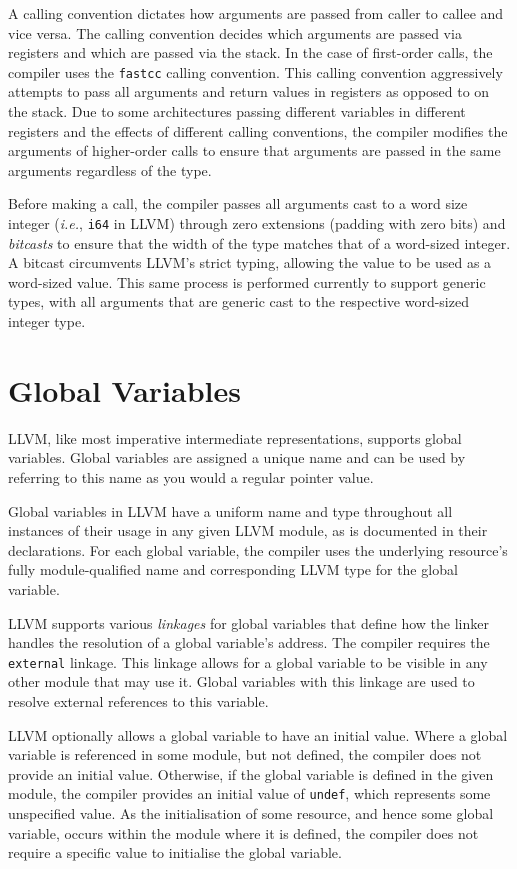 A calling convention dictates how arguments are passed from caller to callee and vice versa. The calling convention decides which arguments are passed via registers and which are passed via the stack. In the case of first-order calls, the compiler uses the \texttt{fastcc} calling convention. This calling convention aggressively attempts to pass all arguments and return values in registers as opposed to on the stack. Due to some architectures passing different variables in different registers and the effects of different calling conventions, the compiler modifies the arguments of higher-order calls to ensure that arguments are passed in the same arguments regardless of the type. 

Before making a call, the compiler passes all arguments cast to a word size integer (\textit{i.e.}, \texttt{i64} in LLVM) through zero extensions (padding with zero bits) and \textit{bitcasts} to ensure that the width of the type matches that of a word-sized integer. A bitcast circumvents LLVM's strict typing, allowing the value to be used as a word-sized value. This same process is performed currently to support generic types, with all arguments that are generic cast to the respective word-sized integer type.

\section{Global Variables}
\label{sec:llvm-globals}

LLVM, like most imperative intermediate representations, supports global variables. Global variables are assigned a unique name and can be used by referring to this name as you would a regular pointer value. 

Global variables in LLVM have a uniform name and type throughout all instances of their usage in any given LLVM module, as is documented in their declarations. For each global variable, the compiler uses the underlying resource's fully module-qualified name and corresponding LLVM type for the global variable.

LLVM supports various \textit{linkages} for global variables that define how the linker handles the resolution of a global variable's address. The compiler requires the \texttt{external} linkage. This linkage allows for a global variable to be visible in any other module that may use it. Global variables with this linkage are used to resolve external references to this variable.

LLVM optionally allows a global variable to have an initial value. Where a global variable is referenced in some module, but not defined, the compiler does not provide an initial value. Otherwise, if the global variable is defined in the given module, the compiler provides an initial value of \texttt{undef}, which represents some unspecified value. As the initialisation of some resource, and hence some global variable, occurs within the module where it is defined, the compiler does not require a specific value to initialise the global variable.

